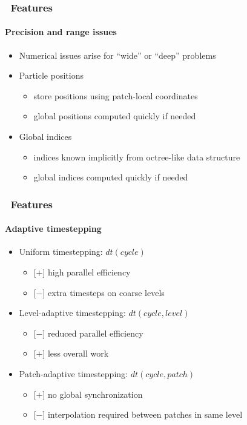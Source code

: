 \begin{frame}[fragile] 
\frametitle{\cello\ Features}
\framesubtitle{Precision and range issues}
\begin{itemize}
\item{} Numerical issues arise for ``wide'' or ``deep'' problems
\item{} Particle positions
\begin{itemize}
\item{} store positions using patch-local coordinates
\item{} global positions computed quickly if needed
\end{itemize}
\item{} Global indices
\begin{itemize}
\item{} indices known implicitly from octree-like data structure
\item{} global indices computed quickly if needed
\end{itemize}
\end{itemize}
\end{frame}

\begin{frame}[fragile] 
\frametitle{\cello\ Features}
\framesubtitle{Adaptive timestepping}
\begin{itemize}
\item{} Uniform timestepping: $dt(cycle)$
\begin{itemize}
\item{}[$+$] high parallel efficiency
\item{}[$-$] extra timesteps on coarse levels
\end{itemize}
\item{} Level-adaptive timestepping: $dt(cycle,level)$
\begin{itemize}
\item{} [$-$]  reduced parallel efficiency 
\item{} [$+$]  less overall work
\end{itemize}
\item{} Patch-adaptive timestepping: $dt(cycle,patch)$
\begin{itemize}
\item{} [$+$] no global synchronization
\item{} [$-$]  interpolation required between patches in same level
\end{itemize}
\end{itemize}
\end{frame}

